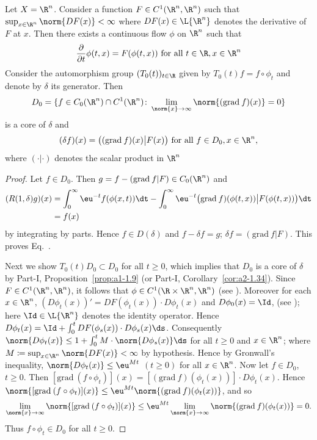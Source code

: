 \begin{example}\label{ex:b2-3.15}
Let $X = \R^{n}$.
Consider a function $F \in C^{1}(\R^{n},\R^{n})$ such that $\sup_{x \in \R^{n}} \norm{DF(x)} < \infty$ where $DF(x) \in \L{\R^{n}}$ denotes the derivative of\/ $F$ at $x$.
Then there exists a continuous flow $\phi$ on $\R^{n}$ such that
\begin{equation}\label{eq:b2-3.20}
\frac{\partial}{\partial t} \phi(t,x) = F(\phi(t,x)) \text{ for all } t \in \R, x \in \R^{n}
\end{equation}
Consider the automorphism group $(T_{0}(t))_{t \in \R}$ given by $T_{0}(t)f = f \circ \phi_{t}$
and denote by $\delta$ its generator.
Then 
\[D_{0} = \{ f \in C_{0}(\R^{n}) \cap C^{1}(\R^{n}) \colon \lim_{\norm{x} \to \infty} \norm{(\mathrm{grad}\: f)(x)} = 0 \}
\]
is a core of\/ $\delta$ and
\begin{equation}\label{eq:b2-3.21}
(\delta f)(x) = \big((\mathrm{grad}\: f)(x) \big| F(x)\big) \text{ for all } f \in D_{0}, x \in \R^{n},
\end{equation}
where $(\cdot|\cdot)$ denotes the scalar product in $\R^{n}$
\end{example}
\begin{proof}
Let $f \in D_{0}$.
Then $g = f - (\mathrm{grad}\: f | F) \in C_{0}(\R^{n})$ and
\[
\begin{split}
(R(1,\delta)g)(x) 
&= \int_{0}^{\infty} \eu^{-t}f(\phi(x,t)) \dt - \int_{0}^{\infty} 
\eu^{-t}\big(\mathrm{grad}\: f)(\phi(t,x)) \big| F(\phi(t,x))\big) \dt \\
&= f(x)
\end{split}
\]
 by integrating by parts.
Hence $f \in D(\delta)$ and $f - \delta f = g$; \ie $\delta f = (\mathrm{grad}\: f|F)$.
This proves Eq.~.

Next we show $T_{0}(t)D_{0} \subset D_{0}$ for all $t \geq 0$, which implies that $D_{0}$ is a core of\/ $\delta$ by Part-I, Proposition~\ref{prop:a1-1.9} (or Part-I, Corollary~\ref{cor:a2-1.34}).
Since $F \in C^{1}(\R^{n},\R^{n})$, it follows that $\phi \in C^{1}(\R \times \R^{n},\R^{n})$ (see \eg \textcite[15.2]{hirschsmale:1974}).
Moreover for each $x \in \R^{n}$, $(D\phi_{t}(x))' = DF(\phi_{t}(x)) \cdot D\phi_{t}(x)$ and $D\phi_{0}(x) = \Id$, (see \textcite[p. 300]{hirschsmale:1974}); here $\Id \in \L{\R^{n}}$ denotes the identity operator.
Hence $D\phi_{t}(x) = \Id + \int_{0}^{t} DF(\phi_{s}(x)) \cdot D\phi_{s}(x) \ds$.
Consequently $\norm{D\phi_{t}(x)} \leq 1 + \int_{0}^{t}  M \cdot  \norm{D\phi_{s}(x)} \ds$ for all $t \geq 0$ and $x \in \R^{n}$; where $M \coloneqq \sup_{x \in \R^{n}} \norm{DF(x)} < \infty$ by hypothesis.
Hence by Gronwall's inequality, $\norm{D\phi_{t}(x)} \leq \eu^{Mt}$ $(t \geq 0)$ for all $x \in \R^{n}$.
Now let $f \in D_{0}$, $t \geq 0$.
Then $[\mathrm{grad}\:(f \circ \phi_{t})](x) = [(\mathrm{grad}\:f)(\phi_{t}(x))] \cdot D\phi_{t}(x)$.
Hence $\norm{[\mathrm{grad}\:(f \circ \phi_{t})](x)} \leq \eu^{Mt}\norm{(\mathrm{grad}\:f)(\phi_{t}(x))}$, and so 
\[
\lim_{\norm{x} \to \infty} \norm{[\mathrm{grad}\:(f \circ \phi_{t})](x)} \leq \eu^{Mt} \lim_{\norm{x} \to \infty} \norm{(\mathrm{grad}\:f)(\phi_{t}(x))} = 0.
\]
Thus $f \circ \phi_{t} \in D_{0}$ for all $t \geq 0$.
\end{proof}
